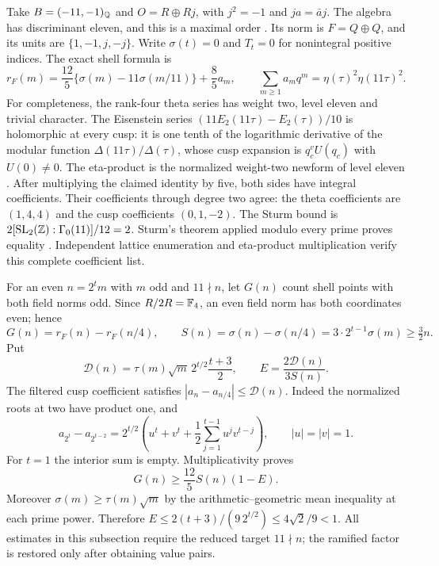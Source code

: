 Take $B=(-11,-1)_\mathbb Q$ and $O=R\oplus Rj$, with $j^2=-1$ and
$ja=\bar a j$.  The algebra has discriminant eleven, and this is a
maximal order \cite[Theorem~15.5.5 and Example~15.5.7]{Voight}.
Its norm is $F=Q\oplus Q$, and its units are $\{1,-1,j,-j\}$.
Write $\sigma(t)=0$ and $T_t=0$ for nonintegral positive indices.
The exact shell formula is
\begin{equation}\label{eq:11-theta}
 r_F(m)=\frac{12}{5}\{\sigma(m)-11\sigma(m/11)\}
                         +\frac85 a_m,
 \qquad
 \sum_{m\ge1}a_mq^m=\eta(\tau)^2\eta(11\tau)^2.
\end{equation}
For completeness, the rank-four theta series has weight two, level
eleven and trivial character.  The Eisenstein series
$(11E_2(11\tau)-E_2(\tau))/10$ is holomorphic at every cusp: it is
one tenth of the logarithmic derivative of the modular function
$\Delta(11\tau)/\Delta(\tau)$, whose cusp expansion is $q_c^vU(q_c)$
with $U(0)\ne0$.  The eta-product is the normalized weight-two newform
of level eleven \cite[Theorem~1, level-eleven row]{MartinOno}.
After multiplying the claimed identity by five, both sides have
integral coefficients.  Their coefficients through degree two agree:
the theta coefficients are $(1,4,4)$ and the cusp coefficients
$(0,1,-2)$.  The Sturm bound is
$2[\mathrm{SL}_2(\mathbb Z):\Gamma_0(11)]/12=2$.
Sturm's theorem applied modulo every prime proves equality
\cite[Theorem~1]{Sturm}.  Independent lattice enumeration and
eta-product multiplication verify this complete coefficient list.

For an even $n=2^t m$ with $m$ odd and $11\nmid n$, let $G(n)$
count shell points with both field norms odd.  Since $R/2R=\mathbb F_4$,
an even field norm has both coordinates even; hence
\[
 G(n)=r_F(n)-r_F(n/4),\qquad
 S(n)=\sigma(n)-\sigma(n/4)=3\cdot2^{t-1}\sigma(m)\ge\tfrac32 n.
\]
Put
\begin{equation}\label{eq:11-E}
 \mathcal D(n)=\tau(m)\sqrt m\,2^{t/2}\frac{t+3}{2},\qquad
 E=\frac{2\mathcal D(n)}{3S(n)}.
\end{equation}
The filtered cusp coefficient satisfies
$|a_n-a_{n/4}|\le\mathcal D(n)$.  Indeed the normalized roots at two
have product one, and
\[
 a_{2^t}-a_{2^{t-2}}=
 2^{t/2}\left(u^t+v^t+\frac12\sum_{j=1}^{t-1}u^jv^{t-j}\right),
 \qquad |u|=|v|=1.
\]
For $t=1$ the interior sum is empty.  Multiplicativity proves
\begin{equation}\label{eq:11-G}
                       G(n)\ge\frac{12}{5}S(n)(1-E).
\end{equation}
Moreover $\sigma(m)\ge\tau(m)\sqrt m$ by the arithmetic--geometric
mean inequality at each prime power.  Therefore
$E\le2(t+3)/(9\,2^{t/2})\le4\sqrt2/9<1$.
All estimates in this subsection require the reduced target
$11\nmid n$; the ramified factor is restored only after obtaining
value pairs.

